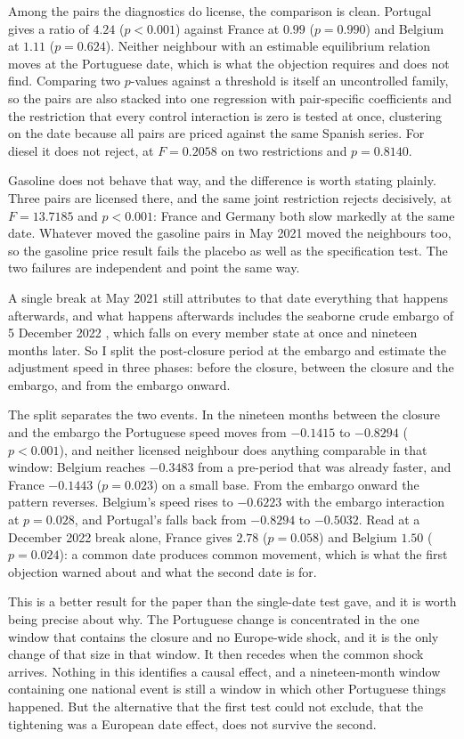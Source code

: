 \documentclass[11pt,a4paper]{article}
\begin{document}
Among the pairs the diagnostics do license, the comparison is clean. Portugal gives a ratio of
$4.24$ ($p<0.001$) against France at $0.99$ ($p=0.990$) and Belgium at $1.11$ ($p=0.624$).
Neither neighbour with an estimable equilibrium relation moves at the Portuguese date, which is
what the objection requires and does not find. Comparing two $p$-values against a threshold is
itself an uncontrolled family, so the pairs are also stacked into one regression with
pair-specific coefficients and the restriction that every control interaction is zero is tested
at once, clustering on the date because all pairs are priced against the same Spanish series.
For diesel it does not reject, at $F=0.2058$ on two restrictions and $p=0.8140$.

Gasoline does not behave that way, and the difference is worth stating plainly. Three pairs are
licensed there, and the same joint restriction rejects decisively, at $F=13.7185$ and $p<0.001$:
France and Germany both slow markedly at the same date. Whatever moved the gasoline pairs in May
2021 moved the neighbours too, so the gasoline price result fails the placebo as well as the
specification test. The two failures are independent and point the same way.

A single break at May 2021 still attributes to that date everything that happens afterwards,
and what happens afterwards includes the seaborne crude embargo of 5 December 2022
\citep{eu2022embargo}, which falls on every member state at once and nineteen months later. So
I split the post-closure period at the embargo and estimate the adjustment speed in three
phases: before the closure, between the closure and the embargo, and from the embargo onward.

The split separates the two events. In the nineteen months between the closure and the embargo
the Portuguese speed moves from $-0.1415$ to $-0.8294$ ($p<0.001$), and neither licensed
neighbour does anything comparable in that window: Belgium reaches $-0.3483$ from a pre-period
that was already faster, and France $-0.1443$ ($p=0.023$) on a small base. From the embargo
onward the pattern reverses. Belgium's speed rises to $-0.6223$ with the embargo interaction at
$p=0.028$, and Portugal's falls back from $-0.8294$ to $-0.5032$. Read at a December 2022 break
alone, France gives $2.78$ ($p=0.058$) and Belgium $1.50$ ($p=0.024$): a common date produces
common movement, which is what the first objection warned about and what the second date is
for.

This is a better result for the paper than the single-date test gave, and it is worth being
precise about why. The Portuguese change is concentrated in the one window that contains the
closure and no Europe-wide shock, and it is the only change of that size in that window. It
then recedes when the common shock arrives. Nothing in this identifies a causal effect, and a
nineteen-month window containing one national event is still a window in which other Portuguese
things happened. But the alternative that the first test could not exclude, that the tightening
was a European date effect, does not survive the second.
\end{document}

